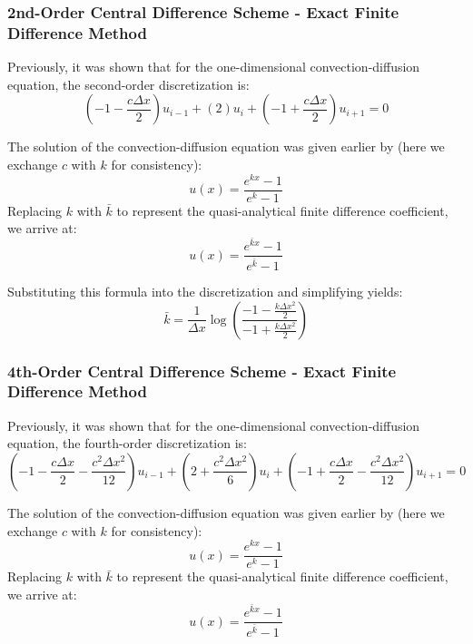 \documentclass[10pt]{article}		%
\numberwithin{equation}{section}
\begin{document}
\subsubsection{2nd-Order Central Difference Scheme - Exact Finite Difference Method}

Previously, it was shown that for the one-dimensional convection-diffusion equation, the second-order discretization is:
\begin{equation}
\left(-1-\frac{c\Delta x}{2}\right)u_{i-1} + \left(2\right)u_{i} + \left(-1+\frac{c\Delta x}{2}\right)u_{i+1} = 0
\end{equation}

The solution of the convection-diffusion equation was given earlier by (here we exchange $c$ with $k$ for consistency):
\begin{equation}
u(x) = \frac{e^{kx}-1}{e^k-1}
\end{equation}
Replacing $k$ with $\bar{k}$ to represent the quasi-analytical finite difference coefficient, we arrive at:
\begin{equation}
u(x) = \frac{e^{\bar{k}x}-1}{e^{\bar{k}}-1}
\end{equation}

Substituting this formula into the discretization and simplifying yields:
\begin{equation}
\bar{k} = \frac{1}{\Delta x} \log \left(\frac{-1-\frac{k\Delta x^2}{2}}{-1+\frac{k\Delta x^2}{2}}\right)
\end{equation}

\subsubsection{4th-Order Central Difference Scheme - Exact Finite Difference Method}

Previously, it was shown that for the one-dimensional convection-diffusion equation, the fourth-order discretization is:
\begin{equation}
\left(-1-\frac{c\Delta x}{2}-\frac{c^2\Delta x^2}{12}\right)u_{i-1} + \left(2+\frac{c^2\Delta x^2}{6}\right)u_{i} + \left(-1+\frac{c\Delta x}{2}-\frac{c^2\Delta x^2}{12}\right)u_{i+1} = 0
\end{equation}

The solution of the convection-diffusion equation was given earlier by (here we exchange $c$ with $k$ for consistency):
\begin{equation}
u(x) = \frac{e^{kx}-1}{e^k-1}
\end{equation}
Replacing $k$ with $\bar{k}$ to represent the quasi-analytical finite difference coefficient, we arrive at:
\begin{equation}
u(x) = \frac{e^{\bar{k}x}-1}{e^{\bar{k}}-1}
\end{equation}
\end{document}
